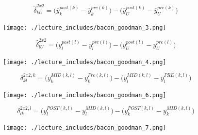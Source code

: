 \documentclass{beamer}
\begin{document}



\begin{frame}[plain]
$$\widehat{\delta}^{2x2}_{kU} = \bigg ( \overline{y}_k^{post(k)} - \overline{y}_k^{pre(k)} \bigg ) - \bigg ( \overline{y}_U^{post(k)} - \overline{y}_U^{pre(k)} \bigg ) $$
	\begin{figure}
	\texttt{[image: ./lecture\_includes/bacon\_goodman\_3.png]}
	\end{figure}

\end{frame}

\begin{frame}[plain]
$$\widehat{\delta}^{2x2}_{lU} = \bigg ( \overline{y}_l^{post(l)} - \overline{y}_l^{pre(l)} \bigg ) - \bigg ( \overline{y}_U^{post(l)} - \overline{y}_U^{pre(l)} \bigg ) $$
	\begin{figure}
	\texttt{[image: ./lecture\_includes/bacon\_goodman\_4.png]}
	\end{figure}

\end{frame}


\begin{frame}[plain]

$$\delta_{kl}^{2x2,k} = \bigg ( \overline{y}_k^{MID(k,l)} - \overline{y}_k^{Pre(k,l)} \bigg ) - \bigg ( \overline{y}_l^{MID(k,l)} - \overline{y}_l^{PRE(k,l)} \bigg ) $$

	\begin{figure}
	\texttt{[image: ./lecture\_includes/bacon\_goodman\_6.png]}
	\end{figure}

\end{frame}

\begin{frame}[plain]
$$\delta_{lk}^{2x2,l} = \bigg ( \overline{y}_l^{POST(k,l)} - \overline{y}_l^{MID(k,l)} \bigg ) - \bigg ( \overline{y}_k^{POST(k,l)} - \overline{y}_k^{MID(k,l)} \bigg ) $$

	\begin{figure}
	\texttt{[image: ./lecture\_includes/bacon\_goodman\_7.png]}
	\end{figure}

\end{frame}


	
\end{document}
